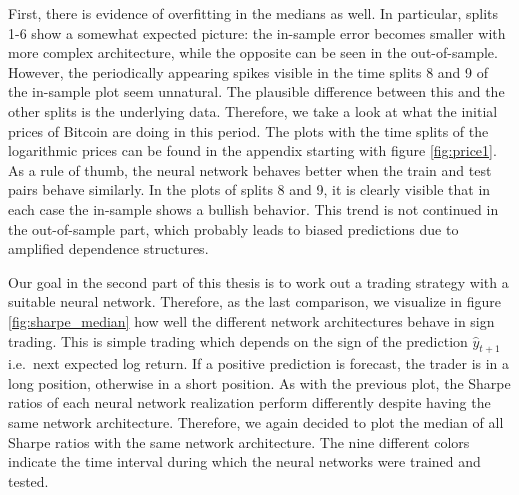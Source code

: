 \documentclass[
]{article}
\begin{document}
First, there is evidence of overfitting in the medians as well. In
particular, splits 1-6 show a somewhat expected picture: the in-sample
error becomes smaller with more complex architecture, while the opposite
can be seen in the out-of-sample. However, the periodically appearing
spikes visible in the time splits 8 and 9 of the in-sample plot seem
unnatural. The plausible difference between this and the other splits is
the underlying data. Therefore, we take a look at what the initial
prices of Bitcoin are doing in this period. The plots with the time
splits of the logarithmic prices can be found in the appendix starting
with figure \ref{fig:price1}. As a rule of thumb, the neural network
behaves better when the train and test pairs behave similarly. In the
plots of splits 8 and 9, it is clearly visible that in each case the
in-sample shows a bullish behavior. This trend is not continued in the
out-of-sample part, which probably leads to biased predictions due to
amplified dependence structures.

\newpage

Our goal in the second part of this thesis is to work out a trading
strategy with a suitable neural network. Therefore, as the last
comparison, we visualize in figure \ref{fig:sharpe_median} how well the
different network architectures behave in sign trading. This is simple
trading which depends on the sign of the prediction \(\hat{y}_{t+1}\)
i.e.~next expected log return. If a positive prediction is forecast, the
trader is in a long position, otherwise in a short position. As with the
previous plot, the Sharpe ratios of each neural network realization
perform differently despite having the same network architecture.
Therefore, we again decided to plot the median of all Sharpe ratios with
the same network architecture. The nine different colors indicate the
time interval during which the neural networks were trained and tested.
\end{document}
